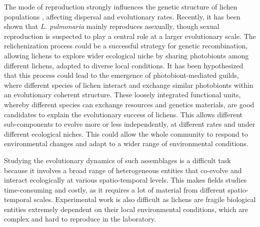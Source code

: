\documentclass[runningheads,a4paper]{llncs}
\begin{document}
The mode of reproduction strongly influences the genetic structure of lichen populations \cite{dal2012vertical,dal2011phylogeny}, affecting dispersal and evolutionary rates. 
Recently, it has been shown that {\em L. pulmonaria} mainly reproduces asexually\cite{dal2012vertical}, though sexual reproduction is suspected to play a central role at a larger evolutionary scale. The relichenization process could be a successful strategy for genetic recombination, allowing lichens to  explore wider ecological niche by sharing photobionts among different lichens, adapted to diverse local conditions. It has been hypothesized that this process could lead to the emergence of photobiont-mediated guilds, where different species of lichen interact and exchange similar photobionts within an evolutionary coherent structure\cite{rikkinen2003ecological}. These loosely integrated functional units, whereby different species can exchange resources and genetics materials, are good candidates to explain the evolutionary success of lichens. This allows different sub-components to evolve more or less independently, at different rates and under different ecological niches. This could allow the whole community to respond to environmental changes and adapt to a wider range of environmental conditions.

Studying the evolutionary dynamics of such assemblages is a difficult task because it involves a broad range of heterogeneous entities that co-evolve and interact ecologically at various spatio-temporal levels. This makes fields studies time-consuming and costly, as it requires
a lot of material from different spatio-temporal scales. Experimental work is also difficult as lichens are fragile biological entities extremely dependent on their local environmental conditions, which are complex and hard to reproduce in the laboratory\cite{nash1996lichen}.    

%
\end{document}
